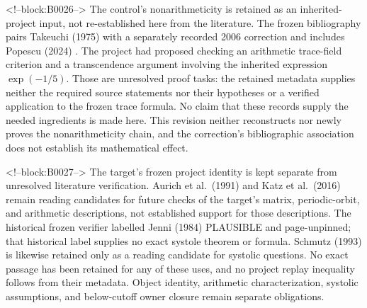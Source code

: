 \documentclass[11pt,a4paper]{article}
\begin{document}
<!--block:B0026-->
The control's nonarithmeticity is retained as an inherited-project input, not re-established here from the literature. The frozen bibliography pairs Takeuchi (1975) with a separately recorded 2006 correction
\citep{P33-S03,P33-S03-CORR}
 and includes Popescu (2024)
\citep{P33-S04}
. The project had proposed checking an arithmetic trace-field criterion and a transcendence argument involving the inherited expression \(\exp(-1/5)\). Those are unresolved proof tasks: the retained metadata supplies neither the required source statements nor their hypotheses or a verified application to the frozen trace formula. No claim that these records supply the needed ingredients is made here. This revision neither reconstructs nor newly proves the nonarithmeticity chain, and the correction's bibliographic association does not establish its mathematical effect.

<!--block:B0027-->
The target's frozen project identity is kept separate from unresolved literature verification. Aurich et al.~(1991)
\citep{P33-S05}
 and Katz et al.~(2016)
\citep{P33-S08}
 remain reading candidates for future checks of the target's matrix, periodic-orbit, and arithmetic descriptions, not established support for those descriptions. The historical frozen verifier labelled Jenni (1984)
\citep{P33-S06}
 PLAUSIBLE and page-unpinned; that historical label supplies no exact systole theorem or formula. Schmutz (1993)
\citep{P33-S07}
 is likewise retained only as a reading candidate for systolic questions. No exact passage has been retained for any of these uses, and no project replay inequality follows from their metadata. Object identity, arithmetic characterization, systolic assumptions, and below-cutoff owner closure remain separate obligations.
\end{document}

